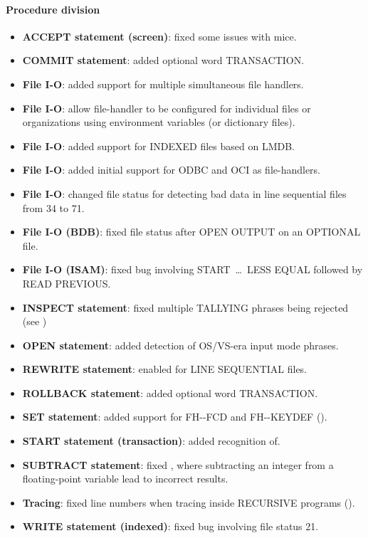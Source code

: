 \paragraph{Procedure division}
\begin{itemize}
\item \textbf{ACCEPT statement (screen)}: fixed some issues with mice.
\item \textbf{COMMIT statement}: added optional word TRANSACTION.
\item \textbf{File I-O}: added support for multiple simultaneous file handlers.
\item \textbf{File I-O}: allow file-handler to be configured for individual files or organizations using environment variables (or dictionary files).
\item \textbf{File I-O}: added support for INDEXED files based on LMDB.
\item \textbf{File I-O}: added initial support for ODBC and OCI as file-handlers.
\item \textbf{File I-O}: changed file status for detecting bad data in line sequential files from 34 to 71.
\item \textbf{File I-O (BDB)}: fixed file status after OPEN OUTPUT on an OPTIONAL file.
\item \textbf{File I-O (ISAM)}: fixed bug involving START\ \ldots\ LESS EQUAL followed by READ PREVIOUS.
\item \textbf{INSPECT statement}: fixed multiple TALLYING phrases being rejected (see )
\item \textbf{OPEN statement}: added detection of OS\slash{}VS-era input mode phrases.
\item \textbf{REWRITE statement}: enabled for LINE SEQUENTIAL files.
\item \textbf{ROLLBACK statement}: added optional word TRANSACTION.
\item \textbf{SET statement}: added support for FH-{}-FCD and FH-{}-KEYDEF ().
\item \textbf{START statement (transaction)}: added recognition of.
\item \textbf{SUBTRACT statement}: fixed , where subtracting an integer from a floating-point variable lead to incorrect results.
\item \textbf{Tracing}: fixed line numbers when tracing inside RECURSIVE programs ().
\item \textbf{WRITE statement (indexed)}: fixed bug involving file status 21.
\end{itemize}

